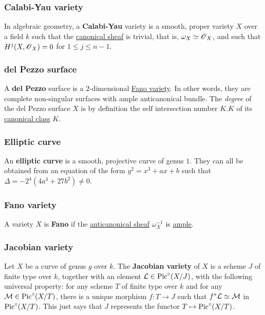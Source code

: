\documentclass[11pt, english]{article}
\begin{document}
\subsubsection{Calabi-Yau variety}

In algebraic geometry, a \textbf{Calabi-Yau} variety is a smooth, proper variety $X$ over a field $k$ such that the \hyperref[canonicaldivisor]{canonical sheaf} is trivial, that is, $\omega_X \simeq \operatorname{\mathscr{O}}_X$, and such that $H^j(X,\operatorname{\mathscr{O}}_X)=0$ for $1 \leq j \leq n-1$. 

\subsubsection{del Pezzo surface}
\label{delpezzo}

A \textbf{del Pezzo} surface is a $2$-dimensional \hyperref[fano]{Fano variety}. In other words, they are complete non-singular surfaces with ample anticanonical bundle. The \emph{degree} of the del Pezzo surface $X$ is by definition the self intersection number $K.K$ of its \hyperref[canonicaldivisor]{canonical class} $K$. 

\subsubsection{Elliptic curve}
\label{ellipticc}

An \textbf{elliptic curve} is a smooth, projective curve of genus $1$. They can all be obtained from an equation of the form $y^2=x^3+ax+b$ such that $\Delta = -2^4(4a^3+27b^2) \neq 0$. 

\subsubsection{Fano variety}
\label{fano}

A variety $X$ is \textbf{Fano} if the \hyperref[anticanonical]{anticanonical  sheaf} $\omega_X^{-1}$ is \hyperref[amplelinebundle]{ample}.  

\subsubsection{Jacobian variety}
\label{jacobianvariety}

Let $X$ be a curve of genus $g$ over $k$. The \textbf{Jacobian variety} of $X$ is a scheme $J$ of finite type over $k$, together with an element $\mathcal{L} \in \operatorname{Pic}^\circ(X/J)$, with the following universal property: for any scheme $T$ of finite type over $k$ and for any $\mathcal M \in \operatorname{Pic}^\circ(X/T)$, there is a unique morphism $f:T \to J$ such that $f^\ast \mathcal{L} \simeq \mathcal M$ in $\operatorname{Pic}^\circ (X/T)$. This just says that $J$ represents the functor $T \mapsto \operatorname{Pic}^\circ(X/T)$. 
\end{document}
